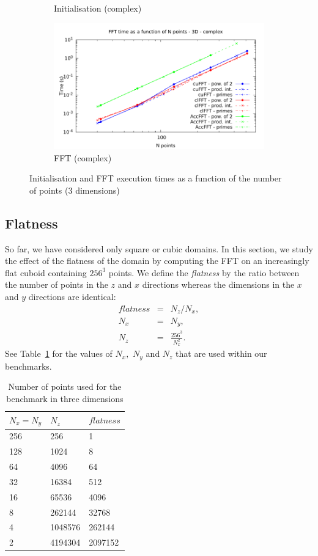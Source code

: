 \documentclass[12pt, a4paper]{article}
\begin{document}
\begin{figure}[htb]
\begin{subfigure}{.5\textwidth}
\caption{Initialisation (complex)}
\label{FFT3DCI}
\end{subfigure}%
\begin{subfigure}{.5\textwidth}
\centering
\includegraphics[width=.9\linewidth]{graphs/fft-3d-c-exec.pdf}
\caption{FFT (complex)}
\label{FFT3DCE}
\end{subfigure}
\caption{Initialisation and FFT execution times as a function of the number of points (3 dimensions)}
\label{FFT3D}
\end{figure}

\subsection{Flatness}\label{FLATNESS}
So far, we have considered only square or cubic domains. In this
section, we study the effect of the flatness of the domain by
computing the FFT on an increasingly flat cuboid containing $256^3$
points. We define the \textit{flatness} by the ratio between the number of
points in the $z$ and $x$ directions whereas the dimensions in the $x$
and $y$ directions are identical:
\begin{eqnarray*}
  flatness & =& N_z/N_x,\\
  N_x & =& N_y,\\
  N_z & = & \frac{256^3}{N_x^2}.
\end{eqnarray*}
 See Table~\ref{FLATNESSDIM} for the
  values of $N_x,$ $N_y$ and $N_z$ that are used within our
  benchmarks.

\begin{table}[H]
\centering
\begin{tabular}{|l|l|l|}
\hline
$N_x=N_y$ & $N_z $ & $flatness$\\ 
\hline
\hline
256 & 256 & 1\\ \hline
128 & 1024 & 8\\ \hline
64 & 4096 & 64\\ \hline
32 & 16384 & 512\\ \hline
16 & 65536 & 4096\\ \hline
8 & 262144 & 32768\\ \hline
4 & 1048576 & 262144\\ \hline 
2 & 4194304 & 2097152\\ \hline
\end{tabular}
\caption{Number of points used for the benchmark in three dimensions}\label{FLATNESSDIM}
\end{table}
\end{document}
